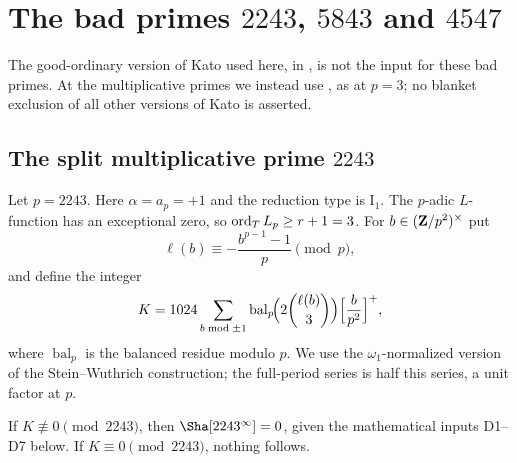 \section[The bad primes 2243, 5843 and 4547]{The bad primes $2243$, $5843$ and $4547$}\label{sec:badprimes}

The good-ordinary version of Kato used here, in \cite[Thm.~7.3]{sw}, is not the input for these bad primes. At the multiplicative primes we instead use \cite[Thm.~A]{skinner}, as at $p=3$; no blanket exclusion of all other versions of Kato is asserted.

\subsection{The split multiplicative prime $2243$}
Let $p=2243$. Here $\alpha=a_p=+1$ and the reduction type is $\mathrm{I}_1$. The $p$-adic $L$-function has an exceptional zero, so $\operatorname{ord}_TL_p\ge r+1=3$. For $b\in(\mathbf{Z}/p^2)^\times$ put
\[
\ell(b)\equiv-\frac{b^{p-1}-1}{p}\pmod p,
\]
and define the integer
\[
K=1024\sum_{b\bmod\pm1}\operatorname{bal}_p\!\Bigl(2\binom{\ell(b)}{3}\Bigr)\Bigl[\frac b{p^2}\Bigr]^+ ,
\]
where $\operatorname{bal}_p$ is the balanced residue modulo $p$. We use the $\omega_1$-normalized version of the Stein--Wuthrich construction; the full-period series is half this series, a unit factor at $p$.

\begin{theorem}\label{thm:2243}
If $K\not\equiv0\pmod{2243}$, then $\Sha[2243^\infty]=0$, given the mathematical inputs D1--D7 below. If $K\equiv0\pmod{2243}$, nothing follows.
\end{theorem}

